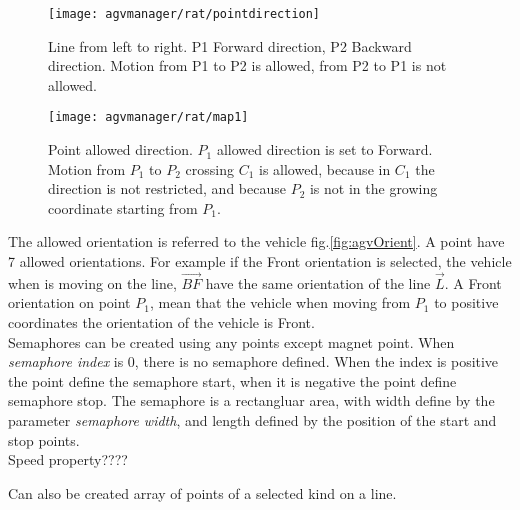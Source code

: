 \begin{figure}[h]
	\centering\texttt{[image: agvmanager/rat/pointdirection]}
	\caption{Line from left to right. P1 Forward direction, P2 Backward direction. Motion from P1 to P2 is allowed, from P2 to P1 is not allowed.}
	\label{fig:pointdirection}
\end{figure}
\begin{figure}[h]
	\centering\texttt{[image: agvmanager/rat/map1]}
	\caption{Point allowed direction. $P_{1}$ allowed direction is set to Forward. Motion from $P_{1}$ to $P_{2}$ crossing $C_{1}$ is allowed, because in $C_{1}$ the direction is not restricted, and because $P_{2}$ is not in the growing coordinate starting from $P_{1}$. }
	\label{fig:map1}
\end{figure}

The allowed orientation is referred to the vehicle fig.\ref{fig:agvOrient}. A point have 7 allowed orientations. For example if the Front orientation is selected, the vehicle when is moving on the line, $\overrightarrow{BF}$ have the same orientation of the line $\overrightarrow{L}$. A Front orientation on point $P_{1}$, mean that the vehicle when moving from $P_{1}$ to positive coordinates the orientation of the vehicle is Front.\\

Semaphores can be created using any points except magnet point. When \textit{semaphore index} is 0, there is no semaphore defined. When the index is positive the point define the semaphore start, when it is negative the point define semaphore stop. The semaphore is a rectangluar area, with width define by the parameter \textit{semaphore width}, and length defined by the position of the start and stop points.\\

Speed property????

Can also be created array of points of a selected kind on a line.

